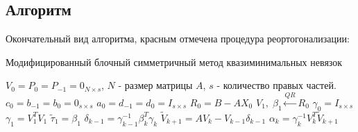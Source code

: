 \subsection{Алгоритм}
\par Окончательный вид алгоритма, красным отмечена процедура реортогонализации:
\begin{algorithm}[H]
    \caption{Модифицированный блочный симметричный метод квазиминимальных невязок}\label{alg:bsqmr_mod}
\begin{algorithmic}
        \State $V_0 = P_{0} = P_{-1} = 0_{N \times s}$, $N$ - размер матрицы $A$, $s$ - количество правых частей.
        \State $c_0 = b_{-1} = b_0 = 0_{s \times s}$
        \State $a_0 = d_{-1} = d_0 = I_{s \times s}$
        \State $R_0 = B - AX_0$
        \State $V_1,\; \beta_1 \xleftarrow{QR} R_0 $
        \State $\gamma_{0} = I_{s \times s}$
        \State $\gamma_{1} = V_1^T V_1$
        \State $\tilde{\tau}_1 = \beta_1 $
            \State $\delta_{k-1} = \gamma_{k-1}^{-1} \beta_k^T \gamma_k $
            \State $\tilde{V}_{k+1} = AV_k - V_{k-1} \delta_{k-1}$
            \State $\alpha_k = \gamma_k^{-1} V_k^T \tilde{V}_{k+1}$
            \end{algorithmic}
            \end{algorithm}
